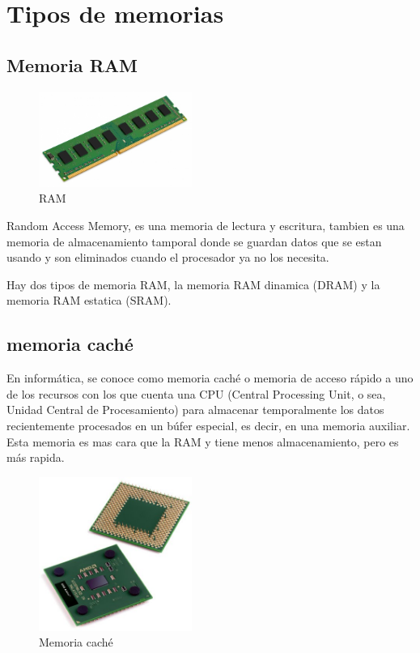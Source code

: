 \documentclass{article}
\begin{document}
\section{Tipos de memorias} \label{Tipos de memorias}

\subsection{Memoria RAM}

\begin{figure}[h]
\includegraphics[width=5cm]{RAM.jpg}
\centering
\caption{RAM}
\label{fig:RAM}
\end{figure}
Random Access Memory, es una memoria de lectura y escritura, tambien es una memoria de almacenamiento tamporal donde se guardan datos que se estan usando y son eliminados cuando el procesador ya no los necesita.

\vspace{0.5cm}

Hay dos tipos de memoria RAM, la memoria RAM dinamica (DRAM) y la memoria RAM estatica (SRAM).

\subsection{memoria caché}
En informática, se conoce como memoria caché o memoria de acceso rápido a uno de los recursos con los que cuenta una CPU (Central Processing Unit, o sea, Unidad Central de Procesamiento) para almacenar temporalmente los datos recientemente procesados en un búfer especial, es decir, en una memoria auxiliar.\cite{pagina} Esta memoria es mas cara que la RAM y tiene menos almacenamiento, pero es más rapida. 


\begin{figure}[h]
\includegraphics[width=5cm]{CACHE.jpg}
\centering
\caption{Memoria caché}
\label{fig:RAM}
\end{figure}
\end{document}
